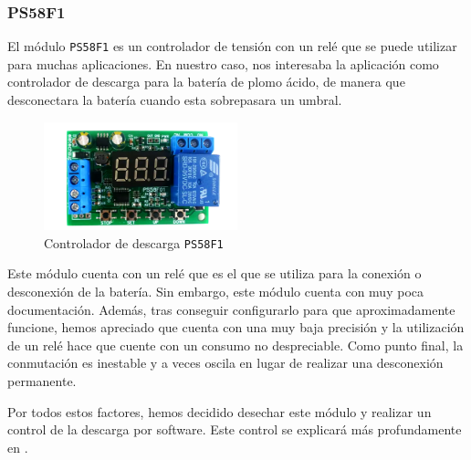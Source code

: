 \subsubsection{PS58F1}

El módulo \texttt{PS58F1} es un controlador de tensión con un relé que se puede utilizar para muchas aplicaciones. En nuestro caso, nos interesaba la aplicación como controlador de descarga para la batería de plomo ácido, de manera que desconectara la batería cuando esta sobrepasara un umbral.

\begin{figure}[h]
    \centering
    \includegraphics[width=0.5\textwidth]{images/2-hardware/componentes/PS58F1.png}
    \caption{Controlador de descarga \texttt{PS58F1}}
    \label{fig:hardware/modulos/controlador_descarga}
\end{figure}

Este módulo cuenta con un relé que es el que se utiliza para la conexión o desconexión de la batería. Sin embargo, este módulo cuenta con muy poca documentación. Además, tras conseguir configurarlo para que aproximadamente funcione, hemos apreciado que cuenta con una muy baja precisión y la utilización de un relé hace que cuente con un consumo no despreciable. Como punto final, la conmutación es inestable y a veces oscila en lugar de realizar una desconexión permanente.

Por todos estos factores, hemos decidido desechar este módulo y realizar un control de la descarga por software. Este control se explicará más profundamente en . 